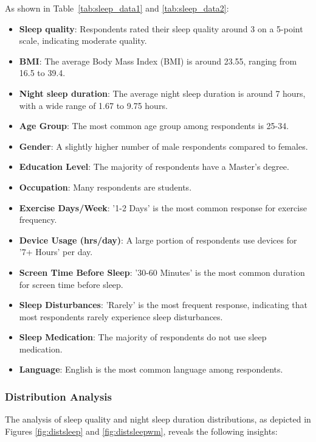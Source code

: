 \documentclass[conference]{IEEEtran}
\begin{document}
As shown in Table~\ref{tab:sleep_data1} and \ref{tab:sleep_data2}:
\begin{itemize}
    \item \textbf{Sleep quality}: Respondents rated their sleep quality around 3 on a 5-point scale, indicating moderate quality.
    \item \textbf{BMI}: The average Body Mass Index (BMI) is around 23.55, ranging from 16.5 to 39.4.
    \item \textbf{Night sleep duration}: The average night sleep duration is around 7 hours, with a wide range of 1.67 to 9.75 hours.\item \textbf{Age Group}: The most common age group among respondents is 25-34.
    \item \textbf{Gender}: A slightly higher number of male respondents compared to females.
    \item \textbf{Education Level}: The majority of respondents have a Master's degree.
    \item \textbf{Occupation}: Many respondents are students.
    \item \textbf{Exercise Days/Week}: '1-2 Days' is the most common response for exercise frequency.
    \item \textbf{Device Usage (hrs/day)}: A large portion of respondents use devices for '7+ Hours' per day.
    \item \textbf{Screen Time Before Sleep}: '30-60 Minutes' is the most common duration for screen time before sleep.
    \item \textbf{Sleep Disturbances}: 'Rarely' is the most frequent response, indicating that most respondents rarely experience sleep disturbances.
    \item \textbf{Sleep Medication}: The majority of respondents do not use sleep medication.
    \item \textbf{Language}: English is the most common language among respondents.

\end{itemize}  

\subsubsection*{Distribution Analysis}
The analysis of sleep quality and night sleep duration distributions, as depicted in Figures \ref{fig:distsleep} and \ref{fig:distsleepwm}, reveals the following insights:
\end{document}
